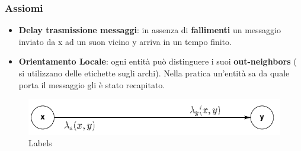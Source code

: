 \documentclass[12pt]{article}
\begin{document}
		\subsubsection{Assiomi}
			\begin{itemize}
				\item \textbf{Delay trasmissione messaggi}: in assenza di \textbf{fallimenti} un messaggio inviato da x ad un suon vicino y arriva in un tempo finito.
				\item \textbf{Orientamento Locale}: ogni entità può distinguere i suoi \textbf{out-neighbors} ( si utilizzano delle etichette sugli archi). Nella pratica un'entità sa da quale porta il messaggio gli è stato recapitato.
			\end{itemize}
			\begin{figure}[h!]
				\centering
				\includegraphics[scale=0.40]{img/lab.png}
				\caption{Labels}
			\end{figure}
		
\end{document}
